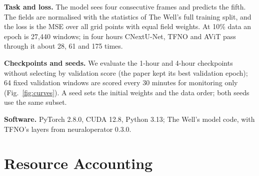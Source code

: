 \documentclass[11pt]{article}
\begin{document}
\newpage
\textbf{Task and loss.} The model sees four consecutive frames and predicts the fifth. The fields are normalised
with the statistics of The Well's full training split, and the loss is the MSE over all grid points with equal
field weights. At 10\% data an epoch is 27,440 windows; in four hours CNextU-Net, TFNO and AViT pass through it
about 28, 61 and 175 times.


\textbf{Checkpoints and seeds.} We evaluate the 1-hour and 4-hour checkpoints without selecting by validation score
(the paper kept its best validation epoch); 64 fixed validation windows are scored every 30 minutes for monitoring
only (Fig.~\ref{fig:curves}). A seed sets the initial weights and the data order; both seeds use the same subset.


\textbf{Software.} PyTorch 2.8.0, CUDA 12.8, Python 3.13; The Well's model code, with TFNO's layers from
neuraloperator 0.3.0.

\section{Resource Accounting}
\label{app:accounting}
\end{document}
